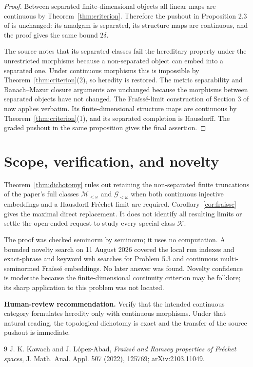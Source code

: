 \documentclass[10pt]{article}
\newcommand{\K}{\mathcal K}
\begin{document}
\begin{proof}
Between separated finite-dimensional objects all linear maps are continuous by
Theorem~\ref{thm:criterion}.  Therefore the pushout in Proposition 2.3 of
\cite{KawachLopezAbad} is unchanged: its amalgam is separated, its structure
maps are continuous, and the proof gives the same bound $2\delta$.

The source notes that its separated classes fail the hereditary property under
the unrestricted morphisms because a non-separated object can embed into a
separated one.  Under continuous morphisms this is impossible by
Theorem~\ref{thm:criterion}(2), so heredity is restored.  The metric
separability and Banach--Mazur closure arguments are unchanged because the
morphisms between separated objects have not changed.  The Fra\"iss\'e-limit
construction of Section 3 of \cite{KawachLopezAbad} now applies verbatim.  Its
finite-dimensional structure maps are continuous by
Theorem~\ref{thm:criterion}(1), and its separated completion is Hausdorff.  The
graded pushout in the same proposition gives the final assertion.
\end{proof}

\section*{Scope, verification, and novelty}

Theorem~\ref{thm:dichotomy} rules out retaining the non-separated finite
truncations of the paper's full classes $\mathcal M_{<\omega}$ and
$\mathcal G_{<\omega}$ when both continuous injective embeddings and a
Hausdorff Fr\'echet limit are required.  Corollary~\ref{cor:fraisse} gives the
maximal direct replacement.  It does not identify all resulting limits or
settle the open-ended request to study every special class $\K$.

The proof was checked seminorm by seminorm; it uses no computation.  A bounded
novelty search on 11 August 2026 covered the local run indexes and exact-phrase
and keyword web searches for Problem 5.3 and continuous multi-seminormed
Fra\"iss\'e embeddings.  No later answer was found.  Novelty confidence is
moderate because the finite-dimensional continuity criterion may be folklore;
its sharp application to this problem was not located.

\textbf{Human-review recommendation.} Verify that the intended continuous
category formulates heredity only with continuous morphisms.  Under that
natural reading, the topological dichotomy is exact and the transfer of the
source pushout is immediate.

\begin{thebibliography}{9}
J. K. Kawach and J. L\'opez-Abad,
\emph{Fra\"iss\'e and Ramsey properties of Fr\'echet spaces},
J. Math. Anal. Appl. 507 (2022), 125769; arXiv:2103.11049.
\end{thebibliography}
\end{document}
